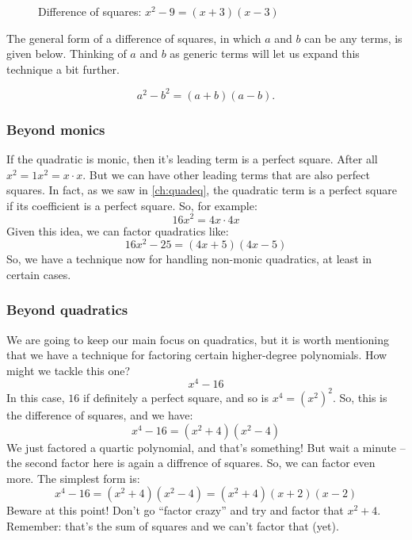 \begin{figure}
\caption{Difference of squares: $x^2-9=(x+3)(x-3)$}
\label{fig:diffsquares}
\end{figure}

The general form of a difference of squares, in which $a$ and $b$ can be any terms, is given below. Thinking of $a$ and $b$ as generic terms will let us expand this technique a bit further.

\begin{boxeddef}
\[a^2 - b^2= (a + b)(a - b).\]
\end{boxeddef}

\subsubsection{Beyond monics}

If the quadratic is monic, then it's leading term is a perfect square. After all $x^2 = 1x^2 = x \cdot x$. But we can have other leading terms that are also perfect squares. In fact, as we saw in \cref{ch:quadeq}, the quadratic term is a perfect square if its coefficient is a perfect square. So, for example:
\[16x^2 = 4x \cdot 4x\]
Given this idea, we can factor quadratics like:
\[16x^2 - 25 = (4x+5)(4x-5)\]
So, we have a technique now for handling non-monic quadratics, at least in certain cases.

\subsubsection{Beyond quadratics}

We are going to keep our main focus on quadratics, but it is worth mentioning that we have a technique for factoring certain higher-degree polynomials. How might we tackle this one?
\[x^4 - 16\]
In this case, $16$ if definitely a perfect square, and so is $x^4 = (x^2)^2$. So, this is the difference of squares, and we have:
\[x^4 - 16 = (x^2+4)(x^2-4)\]
We just factored a quartic polynomial, and that's something! But wait a minute -- the second factor here is again a diffrence of squares. So, we can factor even more. The simplest form is:
\[x^4 - 16 = (x^2+4)(x^2-4) = (x^2+4)(x+2)(x-2)\]
Beware at this point! Don't go ``factor crazy'' and try and factor that $x^2 + 4$. Remember: that's the sum of squares and we can't factor that (yet).

